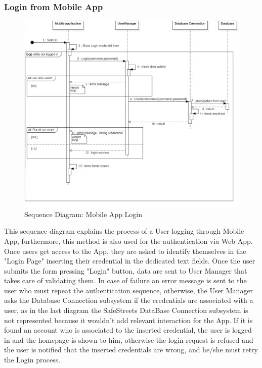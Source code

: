 \subsubsection{Login from Mobile App}
\begin{figure}[H]
\centering
\includegraphics[width=\textwidth]{Images/SequenceLogin.png}
\caption{\label{fig:ComWI}Sequence Diagram: Mobile App Login}
\end{figure}
This sequence diagram explains the process of a User logging through Mobile App, furthermore, this method is also used for the authentication via Web App. Once users get access to the App, they are asked to identify themselves in the "Login Page" inserting their credential in the dedicated text fields. Once the user submits the form pressing "Login" button, data are sent to User Manager that takes care of validating them. In case of failure an error message is sent to the user who must repeat the authentication sequence, otherwise, the User Manager asks the Database Connection subsystem if the credentials are associated with a user, as in the last diagram the SafeStreets DataBase Connection subsystem is not represented because it wouldn’t add relevant interaction for the App. If it is found an account who is associated to the inserted credential, the user is logged in and the homepage is shown to him, otherwise the login request is refused and the user is notified that the inserted credentials are wrong, and he/she must retry the Login process.
